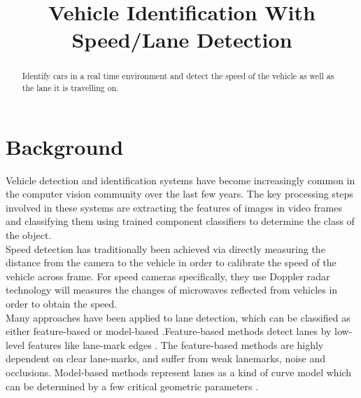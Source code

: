 \documentclass[conference]{IEEEtran}
\begin{document}
\title{Vehicle Identification With Speed/Lane Detection\\}

\author{
\and
{}
\and
{}
}

\maketitle 

\begin{abstract}

Identify cars in a real time environment and detect the speed of the vehicle as well as the lane it is travelling on.
\end{abstract} 

\section{Background}
Vehicle detection and identification systems have become increasingly common in the computer vision community over the last few years\cite{b1,b2,b3,b4,b5}. The key processing steps involved in these systems are extracting the features of images in video frames and classifying them using trained component classifiers to determine the class of the object. \\

Speed detection has traditionally been achieved via directly measuring the distance from the camera to the vehicle in order to calibrate the speed of the vehicle across frame\cite{b6}. For speed cameras specifically, they use Doppler radar technology\cite{b15} will measures the changes of microwaves reflected from vehicles in order to obtain the speed. \\

Many approaches have been applied to lane detection, which
can be classified as either feature-based or model-based \cite{b7,b8}.Feature-based methods detect lanes by low-level features like lane-mark edges \cite{b9,b10,b11}. The feature-based methods are highly dependent on clear lane-marks, and suffer from weak lanemarks, noise and occlusions. Model-based methods represent lanes as a kind of curve model which can be determined by a few critical geometric parameters \cite{b12,b13,b14}. 
\end{document}
